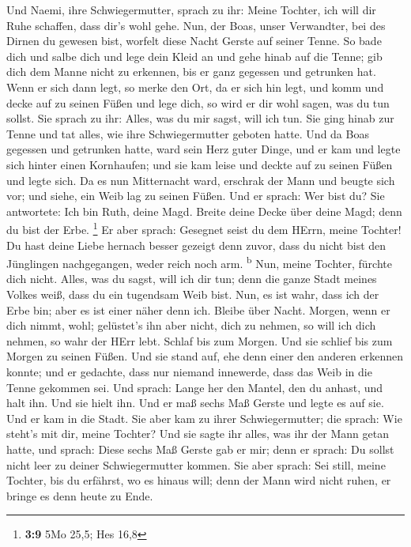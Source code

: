  Und Naemi, ihre Schwiegermutter, sprach zu ihr: Meine
Tochter, ich will dir Ruhe schaffen, dass dir's wohl gehe.
 Nun, der Boas, unser Verwandter, bei des Dirnen du
gewesen bist, worfelt diese Nacht Gerste auf seiner Tenne.
 So bade dich und salbe dich und lege dein Kleid an und
gehe hinab auf die Tenne; gib dich dem Manne nicht zu erkennen, bis er
ganz gegessen und getrunken hat.  Wenn er sich dann legt,
so merke den Ort, da er sich hin legt, und komm und decke auf zu seinen
Füßen und lege dich, so wird er dir wohl sagen, was du tun sollst.
 Sie sprach zu ihr: Alles, was du mir sagst, will ich tun.
 Sie ging hinab zur Tenne und tat alles, wie ihre
Schwiegermutter geboten hatte.  Und da Boas gegessen und
getrunken hatte, ward sein Herz guter Dinge, und er kam und legte sich
hinter einen Kornhaufen; und sie kam leise und deckte auf zu seinen
Füßen und legte sich.  Da es nun Mitternacht ward,
erschrak der Mann und beugte sich vor; und siehe, ein Weib lag zu seinen
Füßen.  Und er sprach: Wer bist du? Sie antwortete: Ich
bin Ruth, deine Magd. Breite deine Decke über deine Magd; denn du bist
der Erbe. \footnote{\textbf{3:9} 5Mo 25,5; Hes 16,8}  Er
aber sprach: Gesegnet seist du dem HErrn, meine Tochter! Du hast deine
Liebe hernach besser gezeigt denn zuvor, dass du nicht bist den
Jünglingen nachgegangen, weder reich noch arm. \textsuperscript{b}
 Nun, meine Tochter, fürchte dich nicht. Alles, was du
sagst, will ich dir tun; denn die ganze Stadt meines Volkes weiß, dass
du ein tugendsam Weib bist.  Nun, es ist wahr, dass ich
der Erbe bin; aber es ist einer näher denn ich.  Bleibe
über Nacht. Morgen, wenn er dich nimmt, wohl; gelüstet's ihn aber nicht,
dich zu nehmen, so will ich dich nehmen, so wahr der HErr lebt. Schlaf
bis zum Morgen.  Und sie schlief bis zum Morgen zu seinen
Füßen. Und sie stand auf, ehe denn einer den anderen erkennen konnte;
und er gedachte, dass nur niemand innewerde, dass das Weib in die Tenne
gekommen sei.  Und sprach: Lange her den Mantel, den du
anhast, und halt ihn. Und sie hielt ihn. Und er maß sechs Maß Gerste und
legte es auf sie. Und er kam in die Stadt.  Sie aber kam
zu ihrer Schwiegermutter; die sprach: Wie steht's mit dir, meine
Tochter? Und sie sagte ihr alles, was ihr der Mann getan hatte,
 und sprach: Diese sechs Maß Gerste gab er mir; denn er
sprach: Du sollst nicht leer zu deiner Schwiegermutter kommen.
 Sie aber sprach: Sei still, meine Tochter, bis du
erfährst, wo es hinaus will; denn der Mann wird nicht ruhen, er bringe
es denn heute zu Ende.

